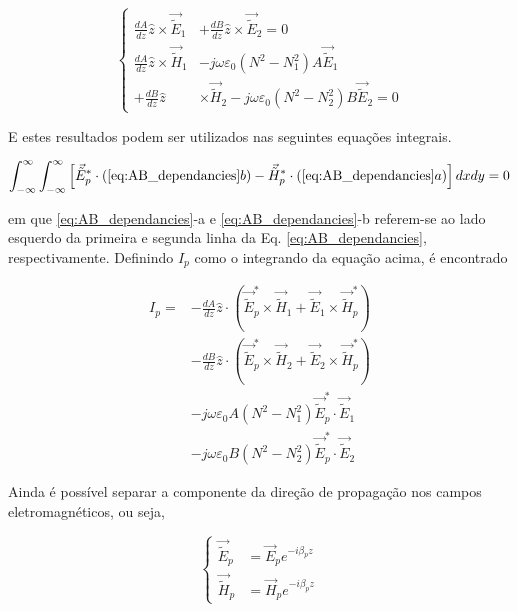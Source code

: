 \documentclass[final,12pt,times,twocolumn]{elsarticle}
\newcommand{\tildee}{ \vec{\tilde{E}}}
\newcommand{\tildeh}{ \vec{\tilde{H}}}
\newcommand{\epsz}{\varepsilon_0}
\begin{document}
\begin{equation}
    \left\{
    \begin{split}
        \frac{dA}{dz}\hat{z}\times\tildee_1 &+ \frac{dB}{dz}\hat{z}\times\tildee_2 = 0 \\
        \frac{dA}{dz}\hat{z}\times\tildeh_1 &-j\omega\epsz\left(N^2-N_1^2\right)A\tildee_1 \\
        + \frac{dB}{dz}\hat{z}&\times\tildeh_2 -j\omega\epsz\left(N^2-N_2^2\right)B\tildee_2 = 0
    \end{split}\right.
    \label{eq:AB_dependancies}
\end{equation}

E estes resultados podem ser utilizados nas seguintes equações integrais.

\begin{equation}
    \int_{-\infty}^\infty \int_{-\infty}^\infty \left[ \tildee_p^*\cdot (\ref{eq:AB_dependancies}b) - \tildeh_p^*\cdot(\ref{eq:AB_dependancies}a) \right] dxdy = 0
    \label{eq:integral_equations}
\end{equation}

em que \eqref{eq:AB_dependancies}-a e \eqref{eq:AB_dependancies}-b referem-se ao lado esquerdo da primeira e segunda linha da Eq. \eqref{eq:AB_dependancies}, respectivamente. Definindo $I_p$ como o integrando da equação acima, é encontrado

\begin{equation}\label{eq:I_p}
\begin{split}
I_p = &- \frac{dA}{dz}\hat{z}\cdot\left( \tildee_p^*\times\tildeh_1 + \tildee_1\times\tildeh_p^*\right) \\
& - \frac{dB}{dz}\hat{z}\cdot\left( \tildee_p^*\times\tildeh_2 + \tildee_2\times\tildeh_p^*\right) \\
& - j\omega\epsz A\left(N^2-N_1^2\right)\tildee_p^*\cdot\tildee_1 \\
& - j\omega\epsz B\left(N^2-N_2^2\right)\tildee_p^*\cdot\tildee_2
\end{split}
\end{equation}

Ainda é possível separar a componente da direção de propagação nos campos eletromagnéticos, ou seja,

\begin{equation*}
    \left\{
    \begin{split}
        \tildee_p &= \vec{E}_pe^{-i\beta_p z} \\
        \tildeh_p &= \vec{H}_pe^{-i\beta_p z}
    \end{split}
    \right.
\end{equation*}
\end{document}
